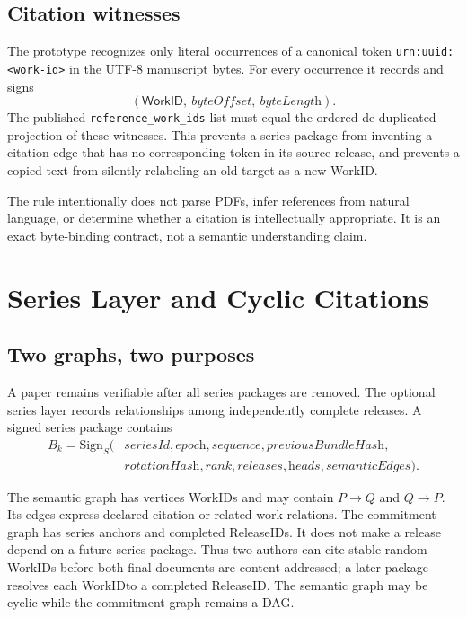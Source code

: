 \documentclass[11pt]{article}
\newcommand{\workid}{\textsf{WorkID}}
\newcommand{\releaseid}{\textsf{ReleaseID}}
\begin{document}
\subsection{Citation witnesses}

The prototype recognizes only literal occurrences of a canonical token \texttt{urn:uuid:<work-id>} in the UTF-8 manuscript bytes. For every occurrence it records and signs
\[
  (\workid,\ \textit{byteOffset},\ \textit{byteLength}).
\]
The published \texttt{reference\_work\_ids} list must equal the ordered de-duplicated projection of these witnesses. This prevents a series package from inventing a citation edge that has no corresponding token in its source release, and prevents a copied text from silently relabeling an old target as a new \workid.

The rule intentionally does not parse PDFs, infer references from natural language, or determine whether a citation is intellectually appropriate. It is an exact byte-binding contract, not a semantic understanding claim.

\section{Series Layer and Cyclic Citations}

\subsection{Two graphs, two purposes}

A paper remains verifiable after all series packages are removed. The optional series layer records relationships among independently complete releases. A signed series package contains
\[
\begin{aligned}
  B_k = \mathrm{Sign}_{S}(&\textit{seriesId},\textit{epoch},\textit{sequence},\textit{previousBundleHash},\\
                           &\textit{rotationHash},\textit{rank},\textit{releases},\textit{heads},\textit{semanticEdges}).
\end{aligned}
\]

The semantic graph has vertices \workid s and may contain $P \rightarrow Q$ and $Q \rightarrow P$. Its edges express declared citation or related-work relations. The commitment graph has series anchors and completed \releaseid s. It does not make a release depend on a future series package. Thus two authors can cite stable random \workid s before both final documents are content-addressed; a later package resolves each \workid to a completed \releaseid. The semantic graph may be cyclic while the commitment graph remains a DAG.
\end{document}
